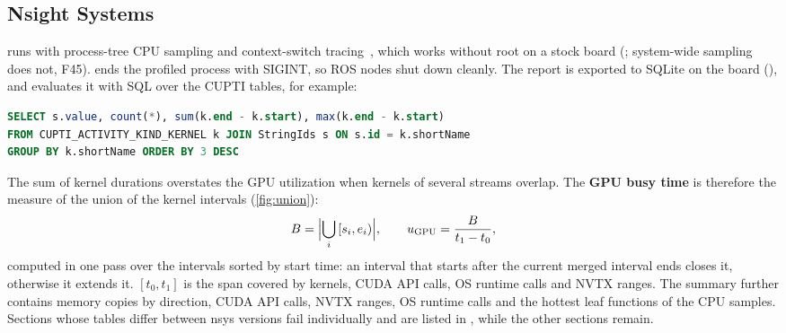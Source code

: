 \documentclass[11pt,a4paper]{article}
\newcommand{\finding}[1]{\textsf{\small F#1}}
\begin{document}
\subsection{Nsight Systems}
 runs  with process-tree CPU
sampling and context-switch tracing~\cite{nsys}, which works without root on a stock board
(; system-wide sampling does not, \finding{45}).  ends the profiled process
with SIGINT, so ROS nodes shut down cleanly. The report is exported to SQLite on the board
(), and  evaluates it with SQL over the CUPTI tables, for example:
\begin{lstlisting}[language=SQL]
SELECT s.value, count(*), sum(k.end - k.start), max(k.end - k.start)
FROM CUPTI_ACTIVITY_KIND_KERNEL k JOIN StringIds s ON s.id = k.shortName
GROUP BY k.shortName ORDER BY 3 DESC
\end{lstlisting}
The sum of kernel durations overstates the GPU utilization when kernels of several streams overlap. The \textbf{GPU busy
time} is therefore the measure of the union of the kernel intervals (\cref{fig:union}):
\begin{equation}
  B = \Bigl\lvert \bigcup_i\, [s_i, e_i) \Bigr\rvert , \qquad u_{\mathrm{GPU}} = \frac{B}{t_1 - t_0},
\end{equation}
computed in one pass over the intervals sorted by start time: an interval that starts after the current merged
interval ends closes it, otherwise it extends it. $[t_0, t_1]$ is the span covered by kernels, CUDA API calls, OS
runtime calls and NVTX ranges. The summary further contains memory copies by direction, CUDA API calls, NVTX ranges,
OS runtime calls and the hottest leaf functions of the CPU samples. Sections whose tables differ between nsys versions
fail individually and are listed in , while the other sections remain.
\end{document}
